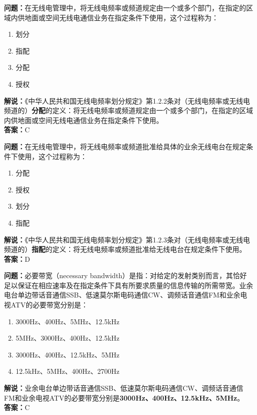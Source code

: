 \bigskip


\noindent\textbf{问题：}在无线电管理中，将无线电频率或频道规定由一个或多个部门，在指定的区域内供地面或空间无线电通信业务在指定条件下使用，这个过程称为：
\begin{enumerate}[label=\Alph*), leftmargin=3em]
\item 划分
\item 指配
\item 分配
\item 授权
\end{enumerate}
\noindent\textbf{解说：}《中华人民共和国无线电频率划分规定》第1.2.2条对（无线电频率或无线电频道的）\textbf{分配}的定义：将无线电频率或频道规定由一个或多个部门，在指定的区域内供地面或空间无线电通信业务在指定条件下使用。\\
\textbf{答案：}C


\bigskip


\noindent\textbf{问题：}在无线电管理中，将无线电频率或频道批准给具体的业余无线电台在规定条件下使用，这个过程称为：
\begin{enumerate}[label=\Alph*), leftmargin=3em]
\item 分配
\item 授权
\item 划分
\item 指配
\end{enumerate}
\noindent\textbf{解说：}《中华人民共和国无线电频率划分规定》第1.2.3条对（无线电频率或无线电频道的）\textbf{指配}的定义：将无线电频率或频道批准给无线电台在规定条件下使用。\\
\textbf{答案：}D



\bigskip


\noindent\textbf{问题：}必要带宽（necessary bandwidth）是指：对给定的发射类别而言，其恰好足以保证在相应速率及在指定条件下具有所要求质量的信息传输的所需带宽。业余电台单边带话音通信SSB、低速莫尔斯电码通信CW、调频话音通信FM和业余电视ATV的必要带宽分别是：
\begin{enumerate}[label=\Alph*), leftmargin=3em]
\item 3000Hz、400Hz、5MHz、12.5kHz
\item 5MHz、3000Hz、400Hz、12.5kHz
\item 3000Hz、400Hz、12.5kHz、5MHz
\item 12.5kHz、5MHz、400Hz、2700Hz
\end{enumerate}
\noindent\textbf{解说：}业余电台单边带话音通信SSB、低速莫尔斯电码通信CW、调频话音通信FM和业余电视ATV的必要带宽分别是\textbf{3000Hz、400Hz、12.5kHz、5MHz}。\\\noindent\textbf{答案：}C


